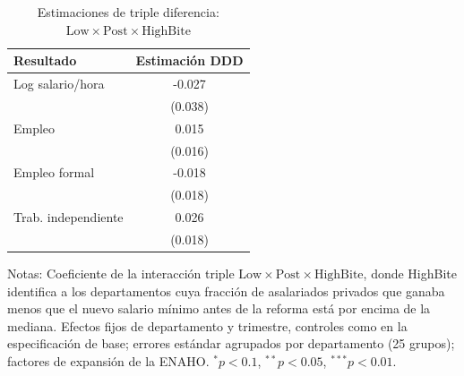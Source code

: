 \begin{table}[!tbp]\centering
\caption{Estimaciones de triple diferencia: $\mathrm{Low}\times\mathrm{Post}\times\mathrm{HighBite}$}\label{tab:ddd}
\begin{threeparttable}
\begin{tabular}{lc}
\toprule
Resultado & Estimación DDD \\
\midrule
Log salario/hora & -0.027 \\
 & (0.038) \\
Empleo & 0.015 \\
 & (0.016) \\
Empleo formal & -0.018 \\
 & (0.018) \\
Trab. independiente & 0.026 \\
 & (0.018) \\
\bottomrule
\end{tabular}
\begin{tablenotes}\footnotesize
\item Notas: Coeficiente de la interacción triple $\mathrm{Low}\times\mathrm{Post}\times\mathrm{HighBite}$, donde HighBite identifica a los departamentos cuya fracción de asalariados privados que ganaba menos que el nuevo salario mínimo antes de la reforma está por encima de la mediana. Efectos fijos de departamento y trimestre, controles como en la especificación de base; errores estándar agrupados por departamento (25 grupos); factores de expansión de la ENAHO. $^{*}p<0.1$, $^{**}p<0.05$, $^{***}p<0.01$.
\end{tablenotes}
\end{threeparttable}\end{table}
